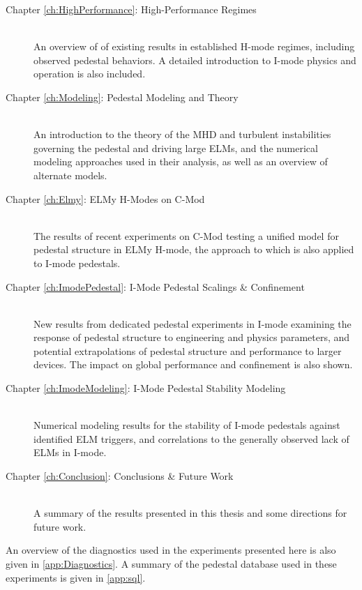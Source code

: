 \begin{description}
 \item[Chapter \ref{ch:HighPerformance}: High-Performance Regimes] \hfill \\
 An overview of of existing results in established H-mode regimes, including observed pedestal behaviors.  A detailed introduction to I-mode physics and operation is also included.
 \item[Chapter \ref{ch:Modeling}: Pedestal Modeling and Theory] \hfill \\
 An introduction to the theory of the MHD and turbulent instabilities governing the pedestal and driving large ELMs, and the numerical modeling approaches used in their analysis, as well as an overview of alternate models.
 \item[Chapter \ref{ch:Elmy}: ELMy H-Modes on C-Mod] \hfill \\
 The results of recent experiments on C-Mod testing a unified model for pedestal structure in ELMy H-mode, the approach to which is also applied to I-mode pedestals.
 \item[Chapter \ref{ch:ImodePedestal}: I-Mode Pedestal Scalings \& Confinement] \hfill \\
 New results from dedicated pedestal experiments in I-mode examining the response of pedestal structure to engineering and physics parameters, and potential extrapolations of pedestal structure and performance to larger devices.  The impact on global performance and confinement is also shown.
 \item[Chapter \ref{ch:ImodeModeling}: I-Mode Pedestal Stability Modeling] \hfill \\
 Numerical modeling results for the stability of I-mode pedestals against identified ELM triggers, and correlations to the generally observed lack of ELMs in I-mode.
 \item[Chapter \ref{ch:Conclusion}: Conclusions \& Future Work] \hfill \\
 A summary of the results presented in this thesis and some directions for future work.
\end{description}

\noindent An overview of the diagnostics used in the experiments presented here is also given in \cref{app:Diagnostics}.  A summary of the pedestal database used in these experiments is given in \cref{app:sql}.\nicechapterending



 